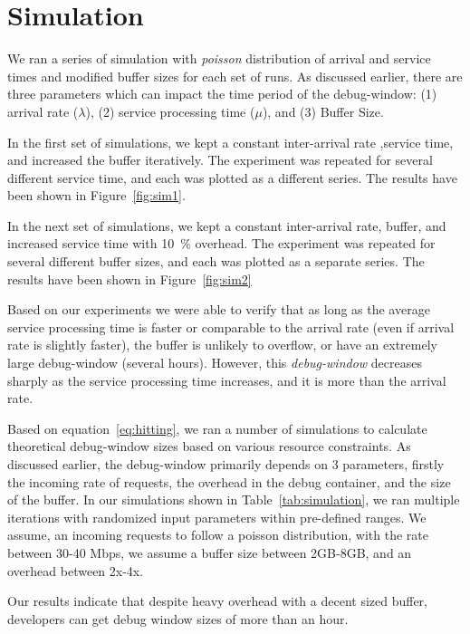 \section{Simulation}
\label{sec:simulation}

We ran a series of simulation with \textit{poisson} distribution of arrival and service times and modified buffer sizes for each set of runs.
As discussed earlier, there are three parameters which can impact the time period of the debug-window: (1) arrival rate ($\lambda$), (2) service processing time ($\mu$), and (3) Buffer Size.

In the first set of simulations, we kept a constant inter-arrival rate ,service time, and increased the buffer iteratively. 
The experiment was repeated for several different service time, and each was plotted as a different series.
The results have been shown in Figure~\ref{fig:sim1}.

In the next set of simulations, we kept a constant inter-arrival rate, buffer, and increased service time with 10~\% overhead.
The experiment was repeated for several different buffer sizes, and each was plotted as a separate series.
The results have been shown in Figure~\ref{fig:sim2}

Based on our experiments we were able to verify that as long as the average service processing time is faster or comparable to the arrival rate (even if arrival rate is slightly faster), the buffer is unlikely to overflow, or have an extremely large debug-window (several hours).
However, this \textit{debug-window} decreases sharply as the service processing time increases, and it is more than the arrival rate. 



\iffalse
Based on equation~\ref{eq:hitting}, we ran a number of simulations to calculate theoretical debug-window sizes based on various resource constraints. 
As discussed earlier, the debug-window primarily depends on 3 parameters, firstly the incoming rate of requests, the overhead in the debug container, and the size of the buffer.
In our simulations shown in Table~\ref{tab:simulation}, we ran multiple iterations with randomized input parameters within pre-defined ranges. 
We assume, an incoming requests to follow a poisson distribution,  with the rate between 30-40 Mbps, we assume a buffer size between 2GB-8GB, and an overhead between 2x-4x. 

Our results indicate that despite heavy overhead with a decent sized buffer, developers can get debug window sizes of more than an hour. 
 
